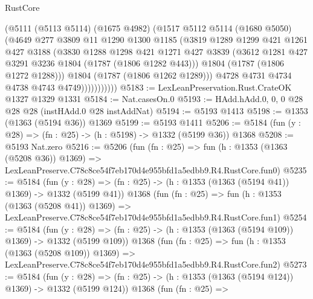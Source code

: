 \begin{lexlean}{RustCore}
\begin{coremodule}
                    (@5111
                      (@5113 @5114)
                      (@1675 @4982)
                      (@1517
                        @5112
                        @5114
                        (@1680 @5050)
                        (@4649
                          @277
                          @3809
                          @11
                          @1290
                          @1300
                          @1185
                          (@3819
                            @1289
                            @1299
                            @421
                            @1261
                            @427
                            @3188
                            (@3830
                              @1288
                              @1298
                              @421
                              @1271
                              @427
                              @3839
                              (@3612 @1281 @427 @3291 @3236 @1804 (@1787 (@1806 @1282 @443)))
                              @1804
                              (@1787 (@1806 @1272 @1288)))
                            @1804
                            (@1787 (@1806 @1262 @1289)))
                          @4728
                          @4731
                          @4734
                          @4738
                          @4743
                          @4749)))))))))))
@5183 := LexLeanPreservation.Rust.CrateOK @1327 @1329 @1331
@5184 := Nat.casesOn.{0}
@5193 := HAdd.hAdd.{0, 0, 0} @28 @28 @28 (instHAdd.{0} @28 instAddNat)
@5194 := @5193 @1413
@5198 := @1353 (@1363 (@5194 @36)) @1369
@5199 := @5193 @1411
@5206 := @5184 (fun (y : @28) => (fn : @25) -> (h : @5198) -> @1332 (@5199 @36)) @1368
@5208 := @5193 Nat.zero
@5216 := @5206
    (fun (fn : @25) =>
    fun (h : @1353 (@1363 (@5208 @36)) @1369) =>
    LexLeanPreserve.C78c8ce54f7eb170d4e955bfd1a5edbb9.R4.RustCore.fun0)
@5235 := @5184
    (fun (y : @28) => (fn : @25) -> (h : @1353 (@1363 (@5194 @41)) @1369) -> @1332 (@5199 @41))
    @1368
    (fun (fn : @25) =>
    fun (h : @1353 (@1363 (@5208 @41)) @1369) =>
    LexLeanPreserve.C78c8ce54f7eb170d4e955bfd1a5edbb9.R4.RustCore.fun1)
@5254 := @5184
    (fun (y : @28) => (fn : @25) -> (h : @1353 (@1363 (@5194 @109)) @1369) -> @1332 (@5199 @109))
    @1368
    (fun (fn : @25) =>
    fun (h : @1353 (@1363 (@5208 @109)) @1369) =>
    LexLeanPreserve.C78c8ce54f7eb170d4e955bfd1a5edbb9.R4.RustCore.fun2)
@5273 := @5184
    (fun (y : @28) => (fn : @25) -> (h : @1353 (@1363 (@5194 @124)) @1369) -> @1332 (@5199 @124))
    @1368
    (fun (fn : @25) =>

\end{coremodule}
\end{lexlean}
